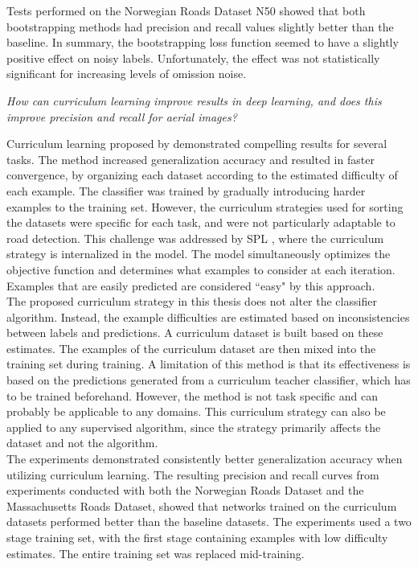 Tests performed on the Norwegian Roads Dataset N50 showed that both bootstrapping methods had precision and recall values slightly better than the baseline. In summary, the bootstrapping loss function seemed to have a slightly positive effect on noisy labels. Unfortunately, the effect was not statistically significant for increasing levels of omission noise. 

\begin{description}[ style=nextline, leftmargin=1.5em, rightmargin=1.5em]
\item[Research question 2:]{\it How can curriculum learning improve results in deep learning, and does this improve precision and recall for aerial images?}
\end{description}

Curriculum learning proposed by \cite{Bengio_curriculumlearning} demonstrated compelling results for several tasks. The method increased generalization accuracy and resulted in faster convergence, by organizing each dataset according to the estimated difficulty of each example. The classifier was trained by gradually introducing harder examples to the training set. However, the curriculum strategies used for sorting the datasets were specific for each task, and were not particularly adaptable to road detection. This challenge was addressed by \ac{SPL} \citep{Kumar_self_paced_learning}, where the curriculum strategy is internalized in the model. The model simultaneously optimizes the objective function and determines what examples to consider at each iteration. Examples that are easily predicted are considered ``easy" by this approach.\\

The proposed curriculum strategy in this thesis does not alter the classifier algorithm. Instead, the example difficulties are estimated based on inconsistencies between labels and predictions. A curriculum dataset is built based on these estimates. The examples of the curriculum dataset are then mixed into the training set during training. A limitation of this method is that its effectiveness is based on the predictions generated from a curriculum teacher classifier, which has to be trained beforehand. However, the method is not task specific and can probably be applicable to any domains. This curriculum strategy can also be applied to any supervised algorithm, since the strategy primarily affects the dataset and not the algorithm. \\

The experiments demonstrated consistently better generalization accuracy when utilizing curriculum learning. The resulting precision and recall curves from experiments conducted with both the Norwegian Roads Dataset and the Massachusetts Roads Dataset, showed that networks trained on the curriculum datasets performed better than  the baseline datasets. The experiments used a two stage training set, with the first stage containing examples with low difficulty estimates. The entire training set was replaced mid-training. \\

